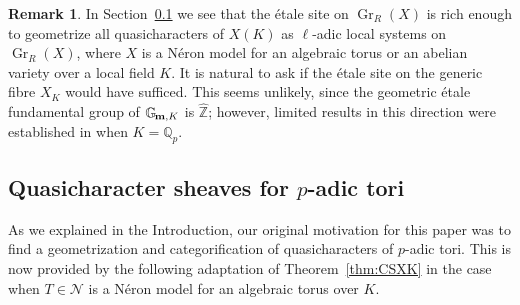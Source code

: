 \documentclass[10pt]{amsart}
\theoremstyle{plain}
\theoremstyle{definition}
\newtheorem{remark}[theorem]{Remark}
\newcommand{\ZZ}{{\mathbb{Z}}}
\newcommand{\Gm}[1]{\mathbb{G}_{\hskip-1pt\textbf{m},#1}}
\DeclareMathOperator{\Gr}{Gr}
\begin{document}
 \begin{remark}
In Section~\ref{ssec:CS_tori} we see that the \'etale site on $\Gr_R(X)$ is rich enough to geometrize all
quasicharacters of $X(K)$ as $\ell$-adic local systems on $\Gr_R(X)$, where $X$ is a N\'eron model for an
algebraic torus or an abelian variety over a local field $K$. 
It is natural to ask if the \'etale site on the generic fibre $X_K$ would have sufficed.
This seems unlikely, since the geometric \'etale fundamental group of $\Gm{K}$ is ${\hat \ZZ}$;
however, limited results in this direction were established in \cite{cunningham-kamgarpour:13a} when $K = \mathbb{Q}_p$.
\end{remark}


\subsection{Quasicharacter sheaves for \texorpdfstring{$p$}{p}-adic tori} \label{ssec:CS_tori}

As we explained in the Introduction, our original motivation for this paper was to find a
geometrization and categorification of quasicharacters of $p$-adic tori. 
This is now provided by the following adaptation of Theorem~\ref{thm:CSXK} in the case when
$T\in \mathcal{N}$ is a N\'eron model for an algebraic torus over $K$.
\end{document}
